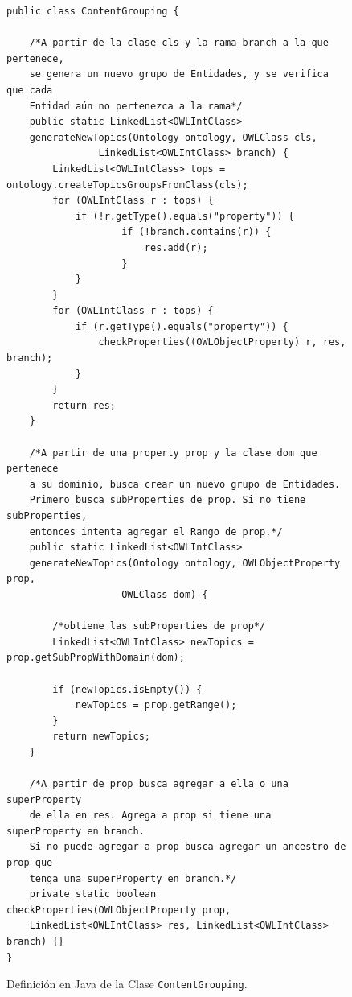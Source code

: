 \begin{figure}
\begin{verbatim}
public class ContentGrouping {

    /*A partir de la clase cls y la rama branch a la que pertenece,
    se genera un nuevo grupo de Entidades, y se verifica que cada
    Entidad aún no pertenezca a la rama*/
    public static LinkedList<OWLIntClass>
    generateNewTopics(Ontology ontology, OWLClass cls, 
                LinkedList<OWLIntClass> branch) {
        LinkedList<OWLIntClass> tops = ontology.createTopicsGroupsFromClass(cls);
        for (OWLIntClass r : tops) {
            if (!r.getType().equals("property")) {
                    if (!branch.contains(r)) {
                        res.add(r);
                    }
            }
        }
        for (OWLIntClass r : tops) {
            if (r.getType().equals("property")) {
                checkProperties((OWLObjectProperty) r, res, branch);
            }
        }
        return res;
    }

    /*A partir de una property prop y la clase dom que pertenece
    a su dominio, busca crear un nuevo grupo de Entidades.
    Primero busca subProperties de prop. Si no tiene subProperties, 
    entonces intenta agregar el Rango de prop.*/
    public static LinkedList<OWLIntClass> 
    generateNewTopics(Ontology ontology, OWLObjectProperty prop,
                    OWLClass dom) {
        
        /*obtiene las subProperties de prop*/
        LinkedList<OWLIntClass> newTopics = prop.getSubPropWithDomain(dom);
        
        if (newTopics.isEmpty()) {
            newTopics = prop.getRange();
        }
        return newTopics;
    }
    
    /*A partir de prop busca agregar a ella o una superProperty
    de ella en res. Agrega a prop si tiene una superProperty en branch.
    Si no puede agregar a prop busca agregar un ancestro de prop que 
    tenga una superProperty en branch.*/
    private static boolean checkProperties(OWLObjectProperty prop,
    LinkedList<OWLIntClass> res, LinkedList<OWLIntClass> branch) {}
}
\end{verbatim}
\caption{Definición en Java de la Clase \texttt{ContentGrouping}.}
\label{fig:clase_content_grouping}
\end{figure}


